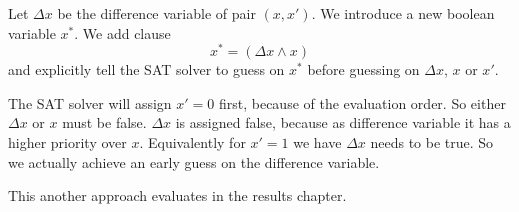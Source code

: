Let $\Delta x$ be the difference variable of pair $(x, x')$. We introduce a new boolean
variable $x^*$. We add clause
\[ x^* = (\Delta x \land x) \]
and explicitly tell the SAT solver to guess on $x^*$ before guessing on $\Delta x$, $x$ or $x'$.

The SAT solver will assign $x'=0$ first, because of the evaluation order. So either $\Delta x$
or $x$ must be false. $\Delta x$ is assigned false, because as difference variable it has a higher
priority over $x$. Equivalently for $x'=1$ we have $\Delta x$ needs to be true. So we actually
achieve an early guess on the difference variable.

This another approach evaluates in the results chapter.
